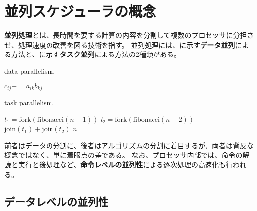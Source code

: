 \documentclass[10pt,a4paper]{book}
\begin{document}
\maketitle
\tableofcontents

\chapter{並列スケジューラの概念}

\textbf{並列処理}とは、長時間を要する計算の内容を分割して複数のプロセッサに分担させ、処理速度の改善を図る技術を指す。
並列処理には、に示す\textbf{データ並列}による方法と、に示す\textbf{タスク並列}による方法の2種類がある。

\begin{center}
\begin{minipage}{.49\textwidth}
\begin{algorithm}[H]
\caption{data parallelism.\label{alg:data}}
\begin{algorithmic}
\State $c_{ij}\mathrel{{+}{=}}a_{ik}b_{kj}$
\EndFor
\EndFor
\EndFor
\EndProcedure
\end{algorithmic}
\end{algorithm}
\end{minipage}
\begin{minipage}{.49\textwidth}
\begin{algorithm}[H]
\caption{task parallelism.\label{alg:task}}
\begin{algorithmic}
\State $t_1=\mathrm{fork}(\mathrm{fibonacci}(n-1))$
\State $t_2=\mathrm{fork}(\mathrm{fibonacci}(n-2))$
\Return $\mathrm{join}(t_1)+\mathrm{join}(t_2)$
\Else
\Return $n$
\EndIf
\EndProcedure
\end{algorithmic}
\end{algorithm}
\end{minipage}
\end{center}

前者はデータの分割に、後者はアルゴリズムの分割に着目するが、両者は背反な概念ではなく、単に着眼点の差である。
なお、プロセッサ内部では、命令の解読と実行と後処理など、\textbf{命令レベルの並列性}による逐次処理の高速化も行われる。

\section{データレベルの並列性}
\end{document}
